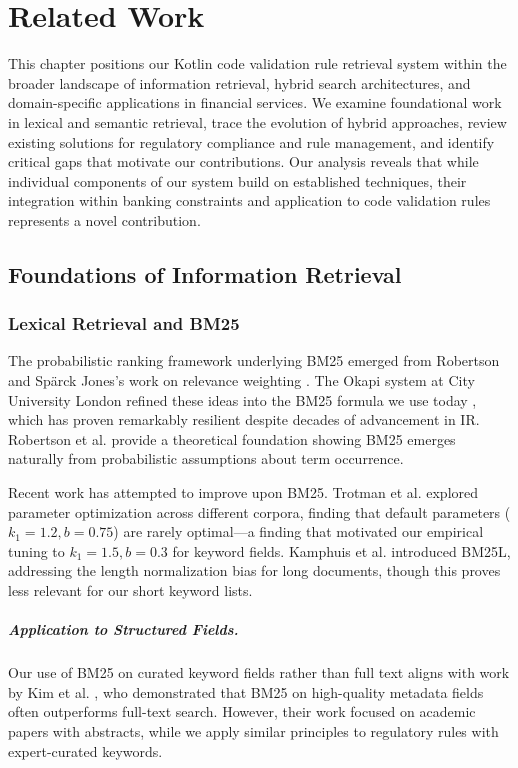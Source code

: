 \chapter{Related Work}
\label{ch:related-work}

This chapter positions our Kotlin code validation rule retrieval system within the broader landscape of information retrieval, hybrid search architectures, and domain-specific applications in financial services. We examine foundational work in lexical and semantic retrieval, trace the evolution of hybrid approaches, review existing solutions for regulatory compliance and rule management, and identify critical gaps that motivate our contributions. Our analysis reveals that while individual components of our system build on established techniques, their integration within banking constraints and application to code validation rules represents a novel contribution.

\section{Foundations of Information Retrieval}

\subsection{Lexical Retrieval and BM25}

The probabilistic ranking framework underlying BM25 emerged from Robertson and Spärck Jones's work on relevance weighting \cite{robertson1976relevance}. The Okapi system at City University London refined these ideas into the BM25 formula we use today \cite{robertson1994okapi}, which has proven remarkably resilient despite decades of advancement in IR. Robertson et al. \cite{bm25-robertson2009} provide a theoretical foundation showing BM25 emerges naturally from probabilistic assumptions about term occurrence.

Recent work has attempted to improve upon BM25. Trotman et al. \cite{trotman2014improvements} explored parameter optimization across different corpora, finding that default parameters ($k_1=1.2, b=0.75$) are rarely optimal—a finding that motivated our empirical tuning to $k_1=1.5, b=0.3$ for keyword fields. Kamphuis et al. \cite{kamphuis2020bm25} introduced BM25L, addressing the length normalization bias for long documents, though this proves less relevant for our short keyword lists.

\paragraph{Application to Structured Fields.} Our use of BM25 on curated keyword fields rather than full text aligns with work by Kim et al. \cite{kim2019structured}, who demonstrated that BM25 on high-quality metadata fields often outperforms full-text search. However, their work focused on academic papers with abstracts, while we apply similar principles to regulatory rules with expert-curated keywords.

